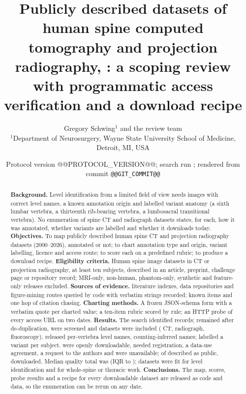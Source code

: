 \documentclass[11pt,a4paper]{article}
\title{Publicly described datasets of human spine computed tomography and projection radiography, \yearRange: a scoping review with programmatic access verification and a download recipe}
\author{Gregory Schwing$^{1}$ and the review team\\[2pt]
\small $^{1}$Department of Neurosurgery, Wayne State University School of Medicine, Detroit, MI, USA}
\date{Protocol version @@PROTOCOL_VERSION@@; search run \runDate; rendered from commit \texttt{@@GIT_COMMIT@@}}
\newcommand{\yearRange}{2000--2026}
\begin{document}
\maketitle

\begin{abstract}
\noindent\textbf{Background.} Level identification from a limited field of view needs images with correct level names, a known annotation origin and labelled variant anatomy (a sixth lumbar vertebra, a thirteenth rib-bearing vertebra, a lumbosacral transitional vertebra). No enumeration of spine CT and radiograph datasets states, for each, how it was annotated, whether variants are labelled and whether it downloads today.
\textbf{Objectives.} To map publicly described human spine CT and projection radiography datasets (\yearRange), annotated or not; to chart annotation type and origin, variant labelling, licence and access route; to score each on a predefined rubric; to produce a download recipe.
\textbf{Eligibility criteria.} Human spine image datasets in CT or projection radiography, at least ten subjects, described in an article, preprint, challenge page or repository record; MRI-only, non-human, phantom-only, synthetic and feature-only releases excluded.
\textbf{Sources of evidence.} \numwordSourcesPlanned{} literature indexes, data repositories and figure-mining routes queried by code with verbatim strings recorded; known items and one hop of citation chasing.
\textbf{Charting methods.} A frozen JSON-schema form with a verbatim quote per charted value; a ten-item rubric scored by rule; an HTTP probe of every access URL on two dates.
\textbf{Results.} The search identified \numIdentified{} records; \numAfterMerge{} remained after de-duplication, \numScreened{} were screened and \numwordDatasets{} datasets were included (\numwordDatasetsCT{} CT, \numwordDatasetsXR{} radiograph, \numwordDatasetsFluoro{} fluoroscopy). \numwordLevelNamesYes{} released per-vertebra level names, \numwordCountingInferred{} counting-inferred names; \numwordVariantExplicit{} labelled a variant per subject. \numwordOpenDownload{} were openly downloadable, \numwordRegistration{} needed registration, \numwordDUA{} a data-use agreement, \numwordRequestToAuthors{} a request to the authors and \numwordUnavailable{} were unavailable; of \numwordDescribedPublic{} described as public, \numPctDescribedPublicDownloads{} downloaded. Median quality total was \numQualityMedian{} (IQR \numQualityQOne{} to \numQualityQThree); \numwordFitLevelId{} datasets were fit for level identification and \numwordFitStitching{} for whole-spine or thoracic work.
\textbf{Conclusions.} The map, scores, probe results and a recipe for every downloadable dataset are released as code and data, so the enumeration can be rerun on any date.
\end{abstract}
\end{document}
